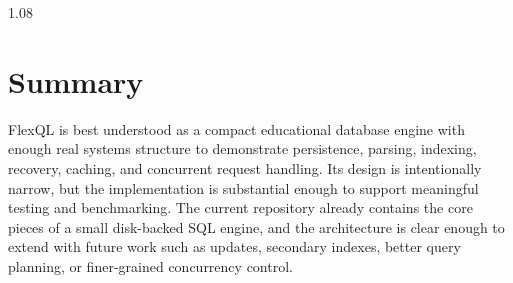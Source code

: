 \documentclass[11pt,a4paper]{article}
\begin{document}
\begin{spacing}{1.08}
\section{Summary}

FlexQL is best understood as a compact educational database engine with enough real systems structure to demonstrate persistence, parsing, indexing, recovery, caching, and concurrent request handling. Its design is intentionally narrow, but the implementation is substantial enough to support meaningful testing and benchmarking. The current repository already contains the core pieces of a small disk-backed SQL engine, and the architecture is clear enough to extend with future work such as updates, secondary indexes, better query planning, or finer-grained concurrency control.

\end{spacing}
\end{document}
